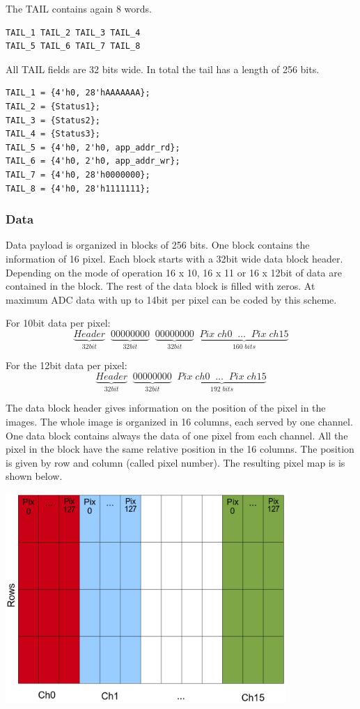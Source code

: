 The TAIL contains again 8 words.

\begin{verbatim}
TAIL_1 TAIL_2 TAIL_3 TAIL_4
TAIL_5 TAIL_6 TAIL_7 TAIL_8
\end{verbatim}

All TAIL fields are 32 bits wide. In total the tail has a length of 256 bits.
\begin{verbatim}
TAIL_1 = {4'h0, 28'hAAAAAAA};
TAIL_2 = {Status1};
TAIL_3 = {Status2};
TAIL_4 = {Status3};
TAIL_5 = {4'h0, 2'h0, app_addr_rd};
TAIL_6 = {4'h0, 2'h0, app_addr_wr};
TAIL_7 = {4'h0, 28'h0000000};
TAIL_8 = {4'h0, 28'h1111111};
\end{verbatim}


\subsubsection{Data}

Data payload is organized in blocks of 256 bits. One block contains the information of 16 pixel. Each block starts with a 32bit wide data block header. Depending on the mode of operation 16 x 10, 16 x 11 or 16 x 12bit of data are contained in the block. The rest of the data block is filled with zeros. At maximum ADC data with up to 14bit per pixel can be coded by this scheme.  

For 10bit data per pixel:
\[
\underbrace{Header}_{32bit} \; \; \underbrace{00000000}_{32bit} \;  \;\underbrace{00000000 }_{32bit} \; \; \underbrace{Pix\;ch0 \;  \; \ldots  \;  \;Pix\;ch15}_{160 \; bits}
\]

For the 12bit data per pixel:
\[
\underbrace{Header}_{32bit} \; \; \underbrace{00000000}_{32bit} \;  \; \underbrace{Pix\;ch0 \;  \; \ldots  \;  \;Pix\;ch15}_{192 \; bits}
\]


The data block header gives information on the position of the pixel in the images. 
The whole image is organized in 16 columns, each served by one channel.
One data block contains always the data of one pixel from each channel.
All the pixel in the block have the same relative position in the 16 columns. 
The position is given by row and column (called pixel number). 
The resulting pixel map is is shown below.

\includegraphics[width=0.8\textwidth]{images/pixel_map.png}

